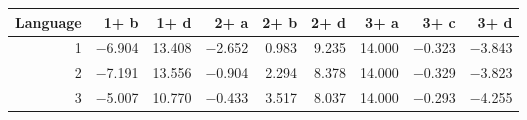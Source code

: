 \begin{tabular}{rrrrrrrrr}
\toprule
   Language &   1+ b &   1+ d &   2+ a &   2+ b &   2+ d &   3+ a &   3+ c &   3+ d \\
\midrule
          1 & \num{-6.904} & \num{13.408} & \num{-2.652} &  \num{0.983} &  \num{9.235} & \num{14.000} & \num{-0.323} & \num{-3.843} \\
          2 & \num{-7.191} & \num{13.556} & \num{-0.904} &  \num{2.294} &  \num{8.378} & \num{14.000} & \num{-0.329} & \num{-3.823} \\
          3 & \num{-5.007} & \num{10.770} & \num{-0.433} &  \num{3.517} &  \num{8.037} & \num{14.000} & \num{-0.293} & \num{-4.255} \\
\bottomrule
\end{tabular}